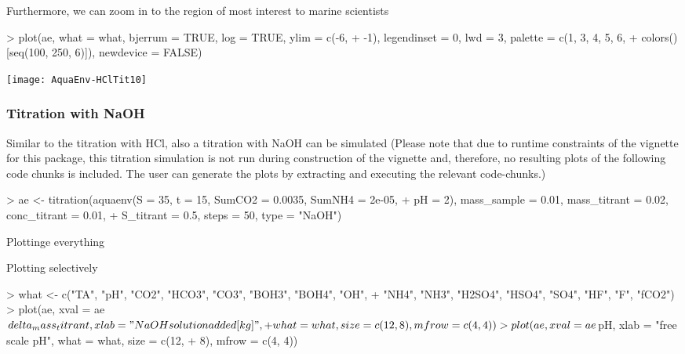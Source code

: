 \documentclass[article,nojss]{jss}
\begin{document}
Furthermore, we can zoom in to the region of most interest to marine scientists
\begin{Schunk}
\begin{Sinput}
> plot(ae, what = what, bjerrum = TRUE, log = TRUE, ylim = c(-6, 
+     -1), legendinset = 0, lwd = 3, palette = c(1, 3, 4, 5, 6, 
+     colors()[seq(100, 250, 6)]), newdevice = FALSE)
\end{Sinput}
\end{Schunk}
\texttt{[image: AquaEnv-HClTit10]}




\subsubsection{Titration with NaOH}

Similar to the titration with HCl, also a titration with NaOH can be simulated
(Please note that due to runtime constraints of the vignette for this package, this titration simulation is not run during construction of the vignette 
and, therefore, no resulting plots of the following code chunks is included. The user can generate the plots by extracting and executing the relevant code-chunks.)

\begin{Schunk}
\begin{Sinput}
> ae <- titration(aquaenv(S = 35, t = 15, SumCO2 = 0.0035, SumNH4 = 2e-05, 
+     pH = 2), mass_sample = 0.01, mass_titrant = 0.02, conc_titrant = 0.01, 
+     S_titrant = 0.5, steps = 50, type = "NaOH")
\end{Sinput}
\end{Schunk}
Plottinge everything
\begin{Schunk}
\end{Schunk}

Plotting selectively
\begin{Schunk}
\begin{Sinput}
> what <- c("TA", "pH", "CO2", "HCO3", "CO3", "BOH3", "BOH4", "OH", 
+     "NH4", "NH3", "H2SO4", "HSO4", "SO4", "HF", "F", "fCO2")
> plot(ae, xval = ae$delta_mass_titrant, xlab = "NaOH solution added [kg]", 
+     what = what, size = c(12, 8), mfrow = c(4, 4))
> plot(ae, xval = ae$pH, xlab = "free scale pH", what = what, size = c(12, 
+     8), mfrow = c(4, 4))
\end{Sinput}
\end{Schunk}
\end{document}
